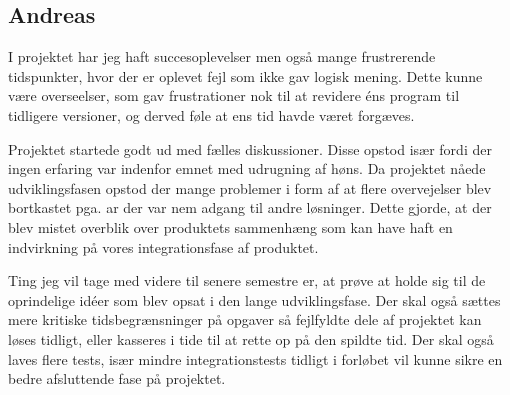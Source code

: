\subsection{Andreas}
I projektet har jeg haft succesoplevelser men også mange frustrerende tidspunkter, hvor der er oplevet fejl som ikke gav logisk mening. Dette kunne være overseelser, som gav frustrationer nok til at revidere éns program til tidligere versioner, og derved føle at ens tid havde været forgæves.

Projektet startede godt ud med fælles diskussioner. Disse opstod især fordi der ingen erfaring var indenfor emnet med udrugning af høns. Da projektet nåede udviklingsfasen opstod der mange problemer i form af at flere overvejelser blev bortkastet pga. ar der var nem adgang til andre løsninger. Dette gjorde, at der blev mistet overblik over produktets sammenhæng som kan have haft en indvirkning på vores integrationsfase af produktet.

Ting jeg vil tage med videre til senere semestre er, at prøve at holde sig til de oprindelige idéer som blev opsat i den lange udviklingsfase. Der skal også sættes mere kritiske tidsbegrænsninger på opgaver så fejlfyldte dele af projektet kan løses tidligt, eller kasseres i tide til at rette op på den spildte tid. Der  skal også laves flere tests, især mindre integrationstests tidligt i forløbet vil kunne sikre en bedre afsluttende fase på projektet.